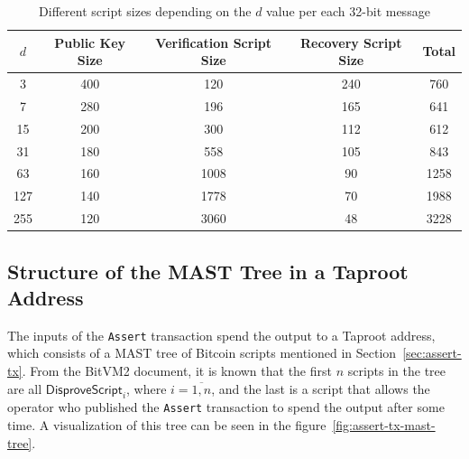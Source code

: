 \documentclass{iacrtrans}
\begin{document}

\begin{table}[h]
  \centering
  \begin{tabular}{ccccc}
    \toprule
    $d$ & Public Key Size & Verification Script Size & Recovery
    Script Size & Total \\
    \midrule
    3 & 400 & 120 & 240 & 760 \\
    7 & 280 & 196 & 165 & 641 \\
    15 & 200 & 300 & 112 & 612 \\
    31 & 180 & 558 & 105 & 843 \\
    63 & 160 & 1008 & 90 & 1258 \\
    127 & 140 & 1778 & 70 & 1988 \\
    255 & 120 & 3060 & 48 & 3228 \\
    \bottomrule
  \end{tabular}
  \caption{Different script sizes depending on the $d$
  value per each 32-bit message}\label{tab:winternitz-script-size}
\end{table}

\subsection{Structure of the MAST Tree in a Taproot
Address}\label{sec:mast-tree-structure}

The inputs of the \texttt{Assert} transaction spend the output to a
Taproot address, which consists of a MAST tree of Bitcoin scripts
mentioned in Section~\ref{sec:assert-tx}. From the BitVM2 document, it
is known that the first \(n\) scripts in the tree are all
\(\mathsf{DisproveScript}_i\), where \(i = \overline{1, n}\), and the last is a
script that allows the operator who published the \texttt{Assert}
transaction to spend the output after some time. A visualization of
this tree can be seen in the figure~\ref{fig:assert-tx-mast-tree}.
\end{document}
